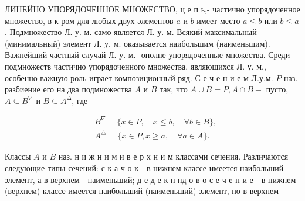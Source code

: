 \documentclass[10pt]{article}
\begin{document}
ЛИНЕЙНО УПОРЯДОЧЕННОЕ МНОЖЕСТВО, ц е п ь,- частично упорядоченное множество, в к-ром для любых двух әлементов $a$ и $b$ имеет место $a \leqslant b$ или $b \leqslant a$. Подмножество Л. у. м. само является Л. у. м. Всякий максимальный (минимальный) элемент Л. у. м. оказывается наибольшим (наименьшим). Важнейший частный случай Л. у. м.- өполне упорядоченные множества. Среди подмножеств частично упорядоченного множества, являющихся Л. у. м., особенно важную роль играет композиционный ряд. С е ч е н и е м Л.у.м. $P$ наз. разбиение его на два подмножества $A$ и $B$ так, что $A \cup B=P, A \cap B-$ пусто, $A \subseteq B^{\nabla}$ и $B \subseteq A^{\Delta}$, где



\[

\begin{aligned}

& B^{\nabla}=\{x \in P, \quad x \leqslant b, \quad \forall b \in B\}, \\

& A^{\triangle}=\{x \in P, x \geqslant a, \quad \forall a \in A\} .

\end{aligned}

\]



Классы $A$ и $B$ наз. н и ж н и м и в е р х н и м классами сечения. Различаются следующие типы сечений: с к а ч о к - в нижнем классе имеется наибольший элемент, а в верхнем - наименьший; д е д е к п нд о в о с е ч е н и е - в нижнем (верхнем) классе имеется наибольший (наименьший) элемент, но в верхнем
\end{document}
